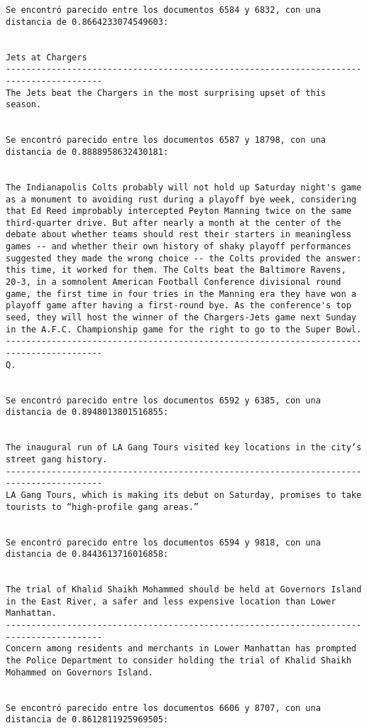 \documentclass[11pt]{article}
\begin{document}
\begin{Verbatim}[commandchars=\\\{\}]
Se encontró parecido entre los documentos 6584 y 6832, con una distancia de 0.8664233074549603:


Jets at Chargers
-----------------------------------------------------------------------------------------
The Jets beat the Chargers in the most surprising upset of this season.


Se encontró parecido entre los documentos 6587 y 18798, con una distancia de 0.8888958632430181:


The Indianapolis Colts probably will not hold up Saturday night's game as a monument to avoiding rust during a playoff bye week, considering that Ed Reed improbably intercepted Peyton Manning twice on the same third-quarter drive. But after nearly a month at the center of the debate about whether teams should rest their starters in meaningless games -- and whether their own history of shaky playoff performances suggested they made the wrong choice -- the Colts provided the answer: this time, it worked for them. The Colts beat the Baltimore Ravens, 20-3, in a somnolent American Football Conference divisional round game, the first time in four tries in the Manning era they have won a playoff game after having a first-round bye. As the conference's top seed, they will host the winner of the Chargers-Jets game next Sunday in the A.F.C. Championship game for the right to go to the Super Bowl.
-----------------------------------------------------------------------------------------
Q.


Se encontró parecido entre los documentos 6592 y 6385, con una distancia de 0.8948013801516855:


The inaugural run of LA Gang Tours visited key locations in the city’s street gang history.
-----------------------------------------------------------------------------------------
LA Gang Tours, which is making its debut on Saturday, promises to take tourists to “high-profile gang areas.”


Se encontró parecido entre los documentos 6594 y 9818, con una distancia de 0.8443613716016858:


The trial of Khalid Shaikh Mohammed should be held at Governors Island in the East River, a safer and less expensive location than Lower Manhattan.
-----------------------------------------------------------------------------------------
Concern among residents and merchants in Lower Manhattan has prompted the Police Department to consider holding the trial of Khalid Shaikh Mohammed on Governors Island.


Se encontró parecido entre los documentos 6606 y 8707, con una distancia de 0.8612811925969505:



\end{Verbatim}
\end{document}
